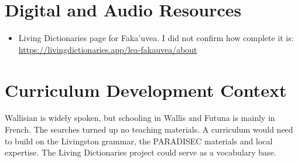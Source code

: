 \documentclass[12pt]{article}
\begin{document}
\section{Digital and Audio Resources}
\begin{itemize}
\item Living Dictionaries page for Faka'uvea. I did not confirm how complete it is: \url{https://livingdictionaries.app/lea-fakauvea/about}
\end{itemize}

\section{Curriculum Development Context}
Wallisian is widely spoken, but schooling in Wallis and Futuna is mainly in French. The searches turned up no teaching materials. A curriculum would need to build on the Livingston grammar, the PARADISEC materials and local expertise. The Living Dictionaries project could serve as a vocabulary base.
\end{document}
